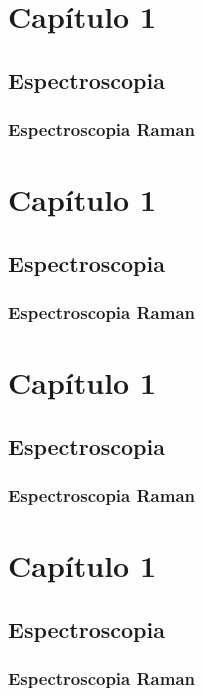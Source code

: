 \documentclass[11pt, twoside]{book}
\begin{document}
	\chapter{Capítulo 1}
 	\section{Espectroscopia}
	\subsection{Espectroscopia Raman}
 	\chapter{Capítulo 1}
 	\section{Espectroscopia}
	\subsection{Espectroscopia Raman}
 	\chapter{Capítulo 1}
 	\section{Espectroscopia}
	\subsection{Espectroscopia Raman}
 	\chapter{Capítulo 1}
 	\section{Espectroscopia}
	\subsection{Espectroscopia Raman}
\end{document}
